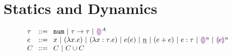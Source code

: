 \section{Statics and Dynamics}
\begin{figure}[t]
$\arraycolsep=4pt\begin{array}{lll}
\tau & ::= &
  \tnum ~\vert~
  \tarr{\tau}{\tau} ~\vert~
  \ehole^A
  \\
e & ::= &
  x ~\vert~
  \lamfunc{x}{e} ~\vert~
  \lamfunc{x:\tau}{e} ~\vert~
  e(e) ~\vert~
  \underlinenum{n} ~\vert~
  (e+e) ~\vert~
  e: \tau ~\vert~
  \ehole^u  ~\vert~
  \notehole{e}^u \\
C & :: = &
	C ~\vert~
	C \cup C \\
\end{array}$
\end{figure}

